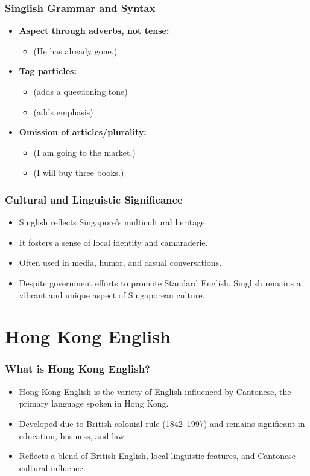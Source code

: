 \documentclass{beamer}
\begin{document}
\begin{frame}
\frametitle{Singlish Grammar and Syntax}
\begin{itemize}
    \item \textbf{Aspect through adverbs, not tense:}
    \begin{itemize}
        \item {} (He has already gone.)
    \end{itemize}
    \item \textbf{Tag particles:}
    \begin{itemize}
        \item {} (adds a questioning tone)
        \item {} (adds emphasis)
    \end{itemize}
    \item \textbf{Omission of articles/plurality:}
    \begin{itemize}
    \item {} (I am going to the market.)
    \item {} (I will buy three books.)
    \end{itemize}
\end{itemize}
\end{frame}

\begin{frame}
\frametitle{Cultural and Linguistic Significance}
\begin{itemize}
    \item Singlish reflects Singapore's multicultural heritage.
    \item It fosters a sense of local identity and camaraderie.
    \item Often used in media, humor, and casual conversations.
    \item Despite government efforts to promote Standard English, Singlish remains a vibrant and unique aspect of Singaporean culture.
\end{itemize}
\end{frame}


\section{Hong Kong English}



\begin{frame}
\frametitle{What is Hong Kong English?}
\begin{itemize}
    \item Hong Kong English is the variety of English influenced by Cantonese, the primary language spoken in Hong Kong.
    \item Developed due to British colonial rule (1842–1997) and remains significant in education, business, and law.
    \item Reflects a blend of British English, local linguistic features, and Cantonese cultural influence.
\end{itemize}
\end{frame}
\end{document}
